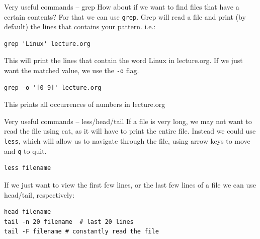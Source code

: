\documentclass[10pt]{beamer}
\begin{document}
\begin{frame}[label={sec:org509ee40},fragile]{Very useful commands -- grep}
 How about if we want to find files that have a certain contents? For that we can
use \texttt{grep}. Grep will read a file and print (by default) the lines that contains
your pattern. i.e.:

\begin{verbatim}
grep 'Linux' lecture.org
\end{verbatim}

This will print the lines that contain the word Linux in lecture.org. If we just
want the matched value, we use the \texttt{-o} flag.

\begin{verbatim}
grep -o '[0-9]' lecture.org
\end{verbatim}

This prints all occurrences of numbers in lecture.org
\end{frame}

\begin{frame}[label={sec:orged48e4e},fragile]{Very useful commands -- less/head/tail}
 If a file is very long, we may not want to read the file using cat, as it will
have to print the entire file. Instead we could use \texttt{less}, which will allow us to
navigate through the file, using arrow keys to move and \texttt{q} to quit.

\begin{verbatim}
less filename
\end{verbatim}

If we just want to view the first few lines, or the last few lines of a file we
can use head/tail, respectively:

\begin{verbatim}
head filename
tail -n 20 filename  # last 20 lines
tail -F filename # constantly read the file
\end{verbatim}
\end{frame}
\end{document}
